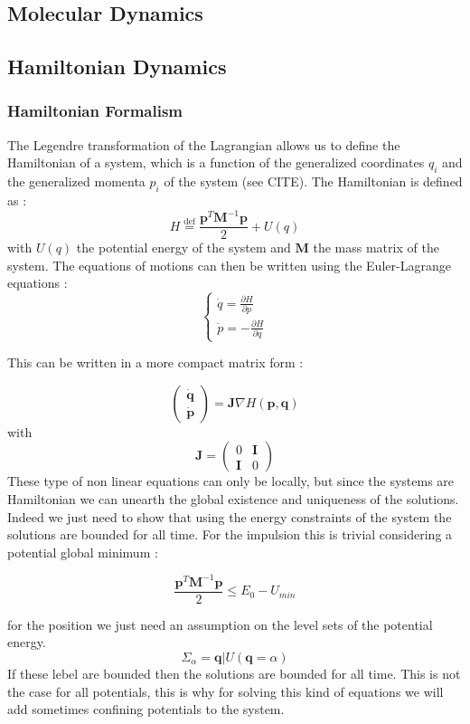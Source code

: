 \documentclass[ansiapaper]{report}
\newcommand*{\defeq}{\stackrel{\text{def}}{=}}
\begin{document}
\begin{multicols}{3}
	\chapter{Molecular Dynamics}
	\section{Hamiltonian Dynamics}
	\subsection{Hamiltonian Formalism}

	The Legendre transformation of the Lagrangian allows us to define the Hamiltonian of a system, which is a function of the generalized coordinates $q_i$ and the generalized momenta $p_i$ of the system (see CITE). The Hamiltonian is defined as :
	$$ H \defeq \frac{\textbf{p} ^T \textbf{M} ^{-1} \textbf{p}  }{2} + U(q)$$
	with $U(q)$ the potential energy of the system and $\textbf{M}$ the mass matrix of the system. The equations of motions can then be written using the Euler-Lagrange equations :
	$$
		\begin{cases}
			\dot{q} = \frac{\partial H}{\partial p} \\
			\dot{p} = -\frac{\partial H}{\partial q}
		\end{cases}
	$$

	This can be written in a more compact matrix form :

	$$ \begin{pmatrix}
			\dot{\textbf{q} } \\
			\dot{\textbf{p} }
		\end{pmatrix} = \textbf{J} \nabla H(\textbf{p} ,\textbf{q} )
	$$
	with $$\textbf{J} = \begin{pmatrix}
			0          & \textbf{I} \\
			\textbf{I} & 0
		\end{pmatrix} $$
	These type of non linear equations can only be locally, but since the systems are Hamiltonian we can unearth the global existence and uniqueness of the solutions. Indeed we just need to show that using the energy constraints of the system the solutions are bounded for all time. For the impulsion this is trivial considering a potential global minimum :

	$$ \frac{\textbf{p}^T \textbf{M} ^{-1} \textbf{p} }{2} \leq E_0 - U_{min}$$

	for the position we just need an assumption on the level sets of the potential energy. $$ \Sigma_{\alpha} = {\textbf{q}|U(\textbf{q} = \alpha) }$$
	If these lebel are bounded then the solutions are bounded for all time. This is not the case for all potentials, this is why for solving this kind of equations we will add sometimes confining potentials to the system.

\end{multicols}
\end{document}
